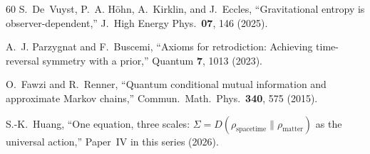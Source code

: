 \documentclass[prd,twocolumn,superscriptaddress,longbibliography,floatfix]{revtex4-2}
\begin{document}
\begin{thebibliography}{60}
S.~De~Vuyst, P.~A. H\"ohn, A.~Kirklin, and J.~Eccles,
``Gravitational entropy is observer-dependent,''
J.\ High Energy Phys.\ \textbf{07}, 146 (2025).

A.~J. Parzygnat and F.~Buscemi,
``Axioms for retrodiction: Achieving time-reversal symmetry
with a prior,''
Quantum \textbf{7}, 1013 (2023).

O.~Fawzi and R.~Renner,
``Quantum conditional mutual information and approximate
Markov chains,''
Commun.\ Math.\ Phys.\ \textbf{340}, 575 (2015).

S.-K.~Huang,
``One equation, three scales:
$\Sigma = D(\rho_{\mathrm{spacetime}} \| \rho_{\mathrm{matter}})$
as the universal action,''
Paper~IV in this series (2026).

\end{thebibliography}
\end{document}
